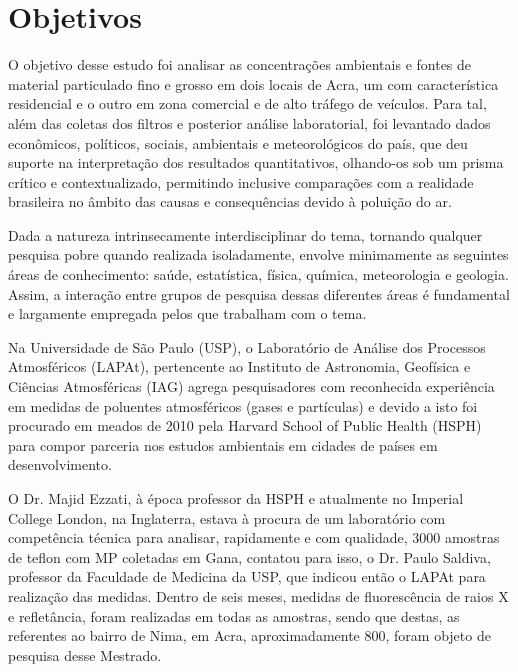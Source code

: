 \section{Objetivos}

O objetivo desse estudo foi analisar as concentrações ambientais e fontes de 
material particulado fino e grosso em dois locais de Acra, um com característica
residencial e o outro em zona comercial e de alto tráfego de veículos. 
Para tal, além das coletas dos filtros e posterior análise laboratorial, 
foi levantado dados econômicos, políticos, sociais, ambientais e 
meteorológicos do país, que deu suporte na interpretação dos resultados 
quantitativos, olhando-os sob um prisma crítico e contextualizado, permitindo
inclusive comparações com a realidade brasileira no âmbito das causas e 
consequências devido à poluição do ar.

Dada a natureza intrinsecamente interdisciplinar do tema, tornando qualquer 
pesquisa pobre quando realizada isoladamente, envolve minimamente as seguintes 
áreas de conhecimento: saúde, estatística, física, química, meteorologia e 
geologia. Assim, a interação entre grupos de pesquisa dessas diferentes áreas 
é fundamental e largamente empregada pelos que trabalham com o tema.

Na Universidade de São Paulo (USP), o Laboratório de Análise dos Processos 
Atmosféricos (LAPAt), pertencente ao Instituto de Astronomia, Geofísica e 
Ciências Atmosféricas (IAG) agrega pesquisadores com reconhecida experiência em 
medidas de poluentes atmosféricos (gases e partículas) e devido a isto foi 
procurado em meados de 2010 pela Harvard School of Public Health (HSPH) para 
compor parceria nos estudos ambientais em cidades de países em desenvolvimento. 

O Dr. Majid Ezzati, à época professor da HSPH e atualmente no Imperial College 
London, na Inglaterra, estava à procura de um laboratório com competência 
técnica para analisar, rapidamente e com qualidade, 3000 amostras de teflon 
com MP coletadas em Gana, contatou para isso, o Dr. Paulo Saldiva, professor 
da Faculdade de Medicina da USP, que indicou então o LAPAt para realização das
medidas. Dentro de seis meses, medidas de fluorescência de raios X e 
refletância, foram realizadas em todas as amostras, sendo que destas, as referentes
ao bairro de Nima, em Acra, aproximadamente 800, foram objeto de pesquisa desse
Mestrado.  

